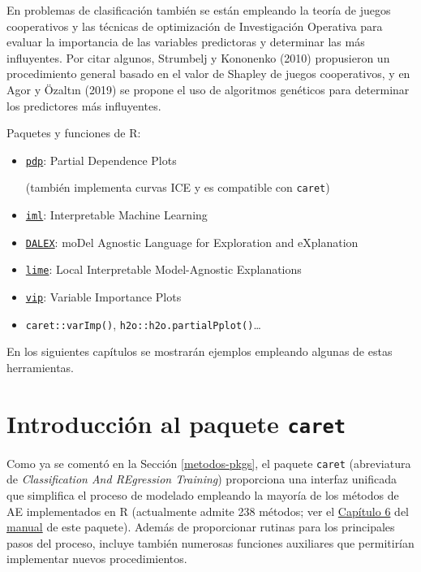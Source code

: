 \documentclass[]{book}
\theoremstyle{break}
\theoremstyle{definition}
\theoremstyle{definition}
\theoremstyle{definition}
\theoremstyle{remark}
\begin{document}
En problemas de clasificación también se están empleando la teoría de
juegos cooperativos y las técnicas de optimización de Investigación
Operativa para evaluar la importancia de las variables predictoras y
determinar las más influyentes. Por citar algunos, Strumbelj y Kononenko
(2010) propusieron un procedimiento general basado en el valor de
Shapley de juegos cooperativos, y en Agor y Özaltın (2019) se propone el
uso de algoritmos genéticos para determinar los predictores más
influyentes.

Paquetes y funciones de R:

\begin{itemize}
\item
  \href{https://bgreenwell.github.io/pdp/index.html}{\texttt{pdp}}:
  Partial Dependence Plots

  (también implementa curvas ICE y es compatible con \texttt{caret})
\item
  \href{https://christophm.github.io/iml}{\texttt{iml}}: Interpretable
  Machine Learning
\item
  \href{https://modeloriented.github.io/DALEX}{\texttt{DALEX}}: moDel
  Agnostic Language for Exploration and eXplanation
\item
  \href{https://lime.data-imaginist.com}{\texttt{lime}}: Local
  Interpretable Model-Agnostic Explanations
\item
  \href{https://koalaverse.github.io/vip/index.html}{\texttt{vip}}:
  Variable Importance Plots
\item
  \texttt{caret::varImp()}, \texttt{h2o::h2o.partialPplot()}\ldots{}
\end{itemize}

En los siguientes capítulos se mostrarán ejemplos empleando algunas de
estas herramientas.

\section{\texorpdfstring{Introducción al paquete
\texttt{caret}}{Introducción al paquete caret}}\label{caret}

Como ya se comentó en la Sección \ref{metodos-pkgs}, el paquete
\texttt{caret} (abreviatura de \emph{Classification And REgression
Training}) proporciona una interfaz unificada que simplifica el proceso
de modelado empleando la mayoría de los métodos de AE implementados en R
(actualmente admite 238 métodos; ver el
\href{https://topepo.github.io/caret/available-models.html}{Capítulo 6}
del \href{https://topepo.github.io/caret}{manual} de este paquete).
Además de proporcionar rutinas para los principales pasos del proceso,
incluye también numerosas funciones auxiliares que permitirían
implementar nuevos procedimientos.
\end{document}
